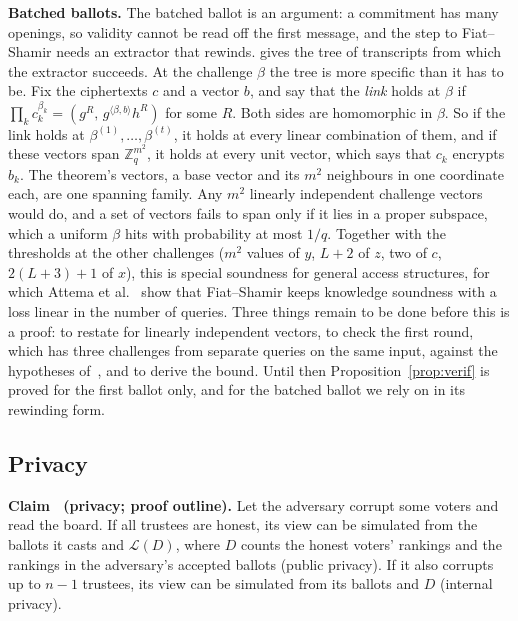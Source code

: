 \textbf{Batched ballots.} The batched ballot is an argument: a
commitment has many openings, so validity cannot be read off the first
message, and the step to Fiat--Shamir needs an extractor that rewinds.
 gives the tree of transcripts from which the
extractor succeeds. At the challenge $\beta$ the tree is more specific
than it has to be. Fix the ciphertexts $c$ and a vector $b$, and say that
the \emph{link} holds at $\beta$ if $\prod_k c_k^{\beta_k} = (g^R,\,
g^{\langle \beta, b \rangle} h^R)$ for some $R$. Both sides are
homomorphic in $\beta$. So if the link holds at $\beta^{(1)}, \ldots,
\beta^{(t)}$, it holds at every linear combination of them, and if these
vectors span $\mathbb{Z}_q^{m^2}$, it holds at every unit vector, which
says that $c_k$ encrypts $b_k$. The theorem's vectors, a base vector and
its $m^2$ neighbours in one coordinate each, are one spanning family.
Any $m^2$ linearly independent challenge vectors would do, and a set of
vectors fails to span only if it lies in a proper subspace, which a
uniform $\beta$ hits with probability at most $1/q$. Together with the
thresholds at the other challenges ($m^2$ values of $y$, $L + 2$ of $z$,
two of $c$, $2(L+3)+1$ of $x$), this is special soundness for general
access structures, for which Attema et al.~\cite{afkr23} show that
Fiat--Shamir keeps knowledge soundness with a loss linear in the number
of queries. Three things remain to be done before this is a proof: to
restate  for linearly independent vectors, to check
the first round, which has three challenges from separate queries on the
same input, against the hypotheses of~\cite{afkr23}, and to derive the
bound. Until then Proposition~\ref{prop:verif} is proved for the first
ballot only, and for the batched ballot we rely on
 in its rewinding form.

\subsection{Privacy}
\label{prop:priv}
\textbf{Claim~\thesecclaim{} (privacy; proof outline).} Let the
adversary corrupt some voters and read the board. If all trustees are
honest, its view can be simulated from the ballots it casts and
$\mathcal{L}(D)$, where $D$ counts the honest voters' rankings and the
rankings in the adversary's accepted ballots (public privacy). If it
also corrupts up to $n - 1$ trustees, its view can be simulated from its
ballots and $D$ (internal privacy).

